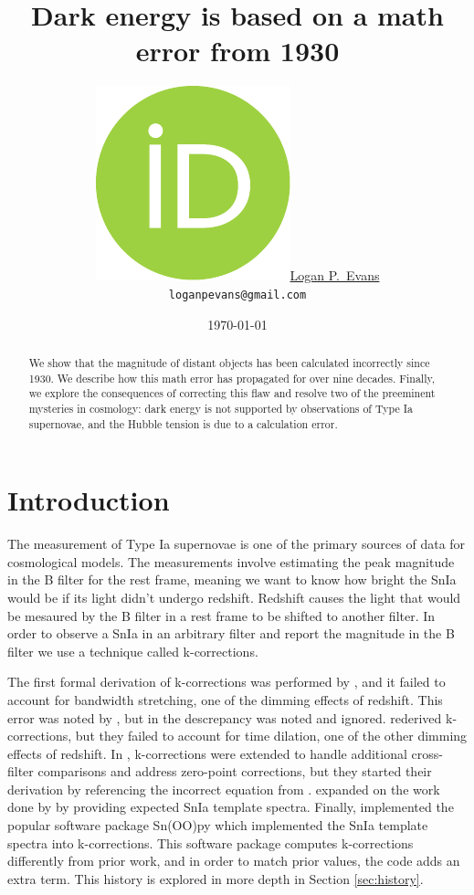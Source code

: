 \documentclass{article}
\title{Dark energy is based on a math error from 1930}
\date{\today}
\author{
  \href{https://orcid.org/0000-0001-6450-3262}{\includegraphics[scale=0.06]{orcid.pdf}\hspace{1mm}Logan P.~Evans}
  \\ \texttt{loganpevans@gmail.com}
}
\begin{document}
\maketitle

\begin{abstract}
  We show that the magnitude of distant objects has been calculated incorrectly
  since 1930. We describe how this math error has propagated for over nine
  decades. Finally, we explore the consequences of correcting this flaw and
  resolve two of the preeminent mysteries in cosmology: dark energy is not
  supported by observations of Type Ia supernovae, and the Hubble tension is
  due to a calculation error.
\end{abstract}


\section{Introduction}

The measurement of Type Ia supernovae is one of the primary sources of data for
cosmological models. The measurements involve estimating the peak magnitude in
the B filter \citet{riess1998} for the rest frame, meaning we want to know how
bright the SnIa would be if its light didn't undergo redshift. Redshift causes
the light that would be mesaured by the B filter in a rest frame to be shifted
to another filter. In order to observe a SnIa in an arbitrary filter and report
the magnitude in the B filter we use a technique called k-corrections.

The first formal derivation of k-corrections was performed by
\citet{tollman1930}, and it failed to account for bandwidth stretching, one of
the dimming effects of redshift. This error was noted by \citet{desitter1934},
but in \citet{hubble1935} the descrepancy was noted and ignored.
\citet{oke1968} rederived k-corrections, but they failed to account for time
dilation, one of the other dimming effects of redshift. In \citet{kim1996},
k-corrections were extended to handle additional cross-filter comparisons and
address zero-point corrections, but they started their derivation by
referencing the incorrect equation from \citet{oke1968}. \citet{hsiao2007}
expanded on the work done by \citet{kim1996} by providing expected SnIa
template spectra. Finally, \citet{burns2010} implemented the popular software
package Sn(OO)py which implemented the SnIa template spectra into
k-corrections. This software package computes k-corrections differently from
prior work, and in order to match prior values, the code adds an extra term.
This history is explored in more depth in Section \ref{sec:history}.
\end{document}
